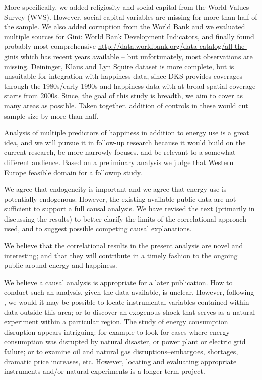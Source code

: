 More specifically, we added religiosity and social capital from the World Values Survey
(WVS). However, social capital variables are missing for more than half of the
sample. We also added corruption from the World
Bank and we evaluated multiple sources for Gini: World Bank Development Indicators, 
and finally found probably most comprehensive
\url{http://data.worldbank.org/data-catalog/all-the-ginis} which has recent
years available -- but unfortunately, most observations are missing. Deininger,
Klaus and Lyn Squire dataset is more complete, but  is unsuitable for integration with happiness data, since DKS provides coverages through the 1980s/early
1990s and happiness data with at broad spatial coverage starts from 2000s.
Since, the goal of this study is breadth,  we aim to cover as many
areas as possible. Taken together, addition of controls in these would cut sample size by
more than half. %

Analysis of multiple predictors of happiness in addition to energy use is a
great idea, and we will pursue it in follow-up research because it would
 build on the current research, be more narrowly focuses. and be relevant to a somewhat different audience. Based on a preliminary analysis we judge that Western Europe  feasible domain for a followup study. 
\\




We agree that endogeneity is important and we agree that energy use is potentially
endogenous. However, the existing available public data are not sufficient to support a full causal analysis. 
We have revised the text (primarily in discussing the results) to better clarify the limits of the correlational approach used, and to
suggest possible competing causal explanations. 

We believe that the correlational results in the present analysis are novel and interesting; and that they will contribute in a timely fashion
to the ongoing public around energy and happiness. 

We believe a causal analysis is appropriate for a later publication. How to conduct such an analysis, given the data available, is unclear. However, following \citep{sorensen12}, we would it may be possible to locate instrumental variables contained within data outside this area; or to discover an exogenous shock that serves as a natural experiment within a particular region. The study of energy consumption disruption appears intriguing: for example to look for cases where  energy consumption was disrupted by natural disaster, or power
 plant or electric grid failure; or to examine oil and natural gas disruptions--embargoes, shortages, dramatic price increases, etc. However, locating and evaluating appropriate instruments and/or natural experiments is a longer-term project. 

